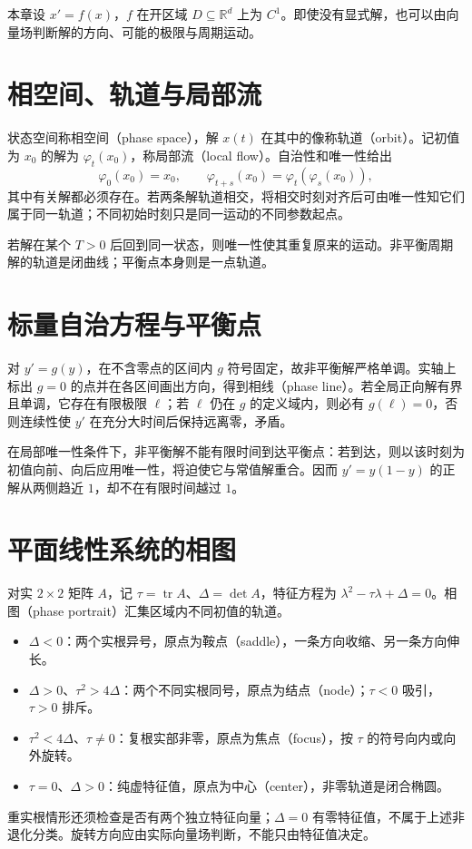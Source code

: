 \documentclass[UTF8,12pt,a4paper,fontset=fandol]{ctexbook}
\begin{document}
本章设 $x'=f(x)$，$f$ 在开区域 $D\subseteq\mathbb R^d$ 上为 $C^1$。即使没有显式解，也可以由向量场判断解的方向、可能的极限与周期运动。

\section{相空间、轨道与局部流}
状态空间称相空间（phase space），解 $x(t)$ 在其中的像称轨道（orbit）。记初值为 $x_0$ 的解为 $\varphi_t(x_0)$，称局部流（local flow）。自治性和唯一性给出
\[
 \varphi_0(x_0)=x_0,\qquad
 \varphi_{t+s}(x_0)=\varphi_t(\varphi_s(x_0)),
\]
其中有关解都必须存在。若两条解轨道相交，将相交时刻对齐后可由唯一性知它们属于同一轨道；不同初始时刻只是同一运动的不同参数起点。

若解在某个 $T>0$ 后回到同一状态，则唯一性使其重复原来的运动。非平衡周期解的轨道是闭曲线；平衡点本身则是一点轨道。

\section{标量自治方程与平衡点}
对 $y'=g(y)$，在不含零点的区间内 $g$ 符号固定，故非平衡解严格单调。实轴上标出 $g=0$ 的点并在各区间画出方向，得到相线（phase line）。若全局正向解有界且单调，它存在有限极限 $\ell$；若 $\ell$ 仍在 $g$ 的定义域内，则必有 $g(\ell)=0$，否则连续性使 $y'$ 在充分大时间后保持远离零，矛盾。

在局部唯一性条件下，非平衡解不能有限时间到达平衡点：若到达，则以该时刻为初值向前、向后应用唯一性，将迫使它与常值解重合。因而 $y'=y(1-y)$ 的正解从两侧趋近 $1$，却不在有限时间越过 $1$。

\section{平面线性系统的相图}
对实 $2\times2$ 矩阵 $A$，记 $\tau=\operatorname{tr}A$、$\Delta=\det A$，特征方程为 $\lambda^2-\tau\lambda+\Delta=0$。相图（phase portrait）汇集区域内不同初值的轨道。
\begin{itemize}
 \item $\Delta<0$：两个实根异号，原点为鞍点（saddle），一条方向收缩、另一条方向伸长。
 \item $\Delta>0$、$\tau^2>4\Delta$：两个不同实根同号，原点为结点（node）；$\tau<0$ 吸引，$\tau>0$ 排斥。
 \item $\tau^2<4\Delta$、$\tau\ne0$：复根实部非零，原点为焦点（focus），按 $\tau$ 的符号向内或向外旋转。
 \item $\tau=0$、$\Delta>0$：纯虚特征值，原点为中心（center），非零轨道是闭合椭圆。
\end{itemize}
重实根情形还须检查是否有两个独立特征向量；$\Delta=0$ 有零特征值，不属于上述非退化分类。旋转方向应由实际向量场判断，不能只由特征值决定。
\end{document}
